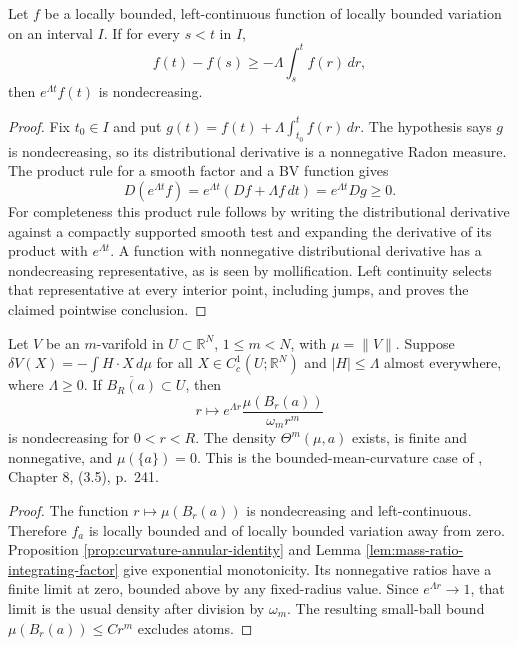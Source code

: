 \begin{lemma}\label{lem:mass-ratio-integrating-factor}
Let $f$ be a locally bounded, left-continuous function of locally bounded variation on an interval $I$. If for every $s<t$ in $I$,
\[
 f(t)-f(s)\geq-\Lambda\int_s^t f(r)\,dr,
\]
then $e^{\Lambda t}f(t)$ is nondecreasing.
\end{lemma}
\begin{proof}
Fix $t_0\in I$ and put $g(t)=f(t)+\Lambda\int_{t_0}^t f(r)\,dr$. The hypothesis says $g$ is nondecreasing, so its distributional derivative is a nonnegative Radon measure. The product rule for a smooth factor and a BV function gives
\[
 D(e^{\Lambda t}f)=e^{\Lambda t}(Df+\Lambda f\,dt)
                  =e^{\Lambda t}Dg\geq0.
\]
For completeness this product rule follows by writing the distributional derivative against a compactly supported smooth test and expanding the derivative of its product with $e^{\Lambda t}$. A function with nonnegative distributional derivative has a nondecreasing representative, as is seen by mollification. Left continuity selects that representative at every interior point, including jumps, and proves the claimed pointwise conclusion.
\end{proof}

\begin{theorem}\label{thm:bounded-curvature-monotonicity}
Let $V$ be an $m$-varifold in $U\subset\mathbb R^N$, $1\leq m<N$, with $\mu=\|V\|$. Suppose $\delta V(X)=-\int H\cdot X\,d\mu$ for all $X\in C_c^1(U;\mathbb R^N)$ and $|H|\leq\Lambda$ almost everywhere, where $\Lambda\geq0$. If $\overline{B_R(a)}\subset U$, then
\[
 r\longmapsto e^{\Lambda r}\frac{\mu(B_r(a))}{\omega_m r^m}
\]
is nondecreasing for $0<r<R$. The density $\Theta^m(\mu,a)$ exists, is finite and nonnegative, and $\mu(\{a\})=0$. This is the bounded-mean-curvature case of \cite{Sim18}, Chapter 8, (3.5), p.~241.
\end{theorem}
\begin{proof}
The function $r\mapsto\mu(B_r(a))$ is nondecreasing and left-continuous. Therefore $f_a$ is locally bounded and of locally bounded variation away from zero. Proposition \ref{prop:curvature-annular-identity} and Lemma \ref{lem:mass-ratio-integrating-factor} give exponential monotonicity. Its nonnegative ratios have a finite limit at zero, bounded above by any fixed-radius value. Since $e^{\Lambda r}\to1$, that limit is the usual density after division by $\omega_m$. The resulting small-ball bound $\mu(B_r(a))\leq Cr^m$ excludes atoms.
\end{proof}

